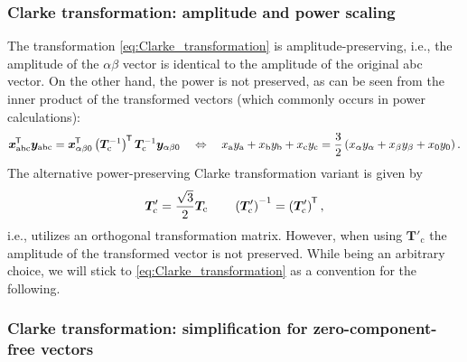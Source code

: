 \begin{frame}
	\frametitle{Clarke transformation: amplitude and power scaling}
    The transformation \eqref{eq:Clarke_transformation} is amplitude-preserving, i.e., the amplitude of the $\alpha\beta$ vector is identical to the amplitude of the original abc vector. On the other hand, the power is not preserved, as can be seen from the inner product of the transformed vectors (which commonly occurs in power calculations):
    \begin{equation*}
        \bm{x}_{\mathrm{abc}}^{\mkern-1.5mu\mathsf{T}} \bm{y}_{\mathrm{abc}} = \bm{x}_\mathrm{\alpha \beta 0}^{\mkern-1.5mu\mathsf{T}}\left(\bm{T}_\mathrm{c}^{-1}\right)^{\mkern-1.5mu\mathsf{T}} \bm{T}_\mathrm{c}^{-1}\bm{y}_\mathrm{\alpha \beta 0} \quad \Leftrightarrow \quad x_\mathrm{a}y_\mathrm{a} + x_\mathrm{b}y_\mathrm{b} + x_\mathrm{c}y_\mathrm{c} = \frac{3}{2}\left(x_\alpha y_\alpha + x_\beta y_\beta + x_0 y_0 \right).
    \end{equation*}
    The alternative power-preserving Clarke transformation variant is given by
    \begin{equation}
        \renewcommand{\arraystretch}{1.2}
        \bm{T}'_\mathrm{c} = \frac{\sqrt{3}}{2} \bm{T}_\mathrm{c} \qquad \left(\bm{T}'_\mathrm{c}\right)^{-1} = \left(\bm{T}'_\mathrm{c}\right)\T,
        \label{eq:Clarke_transformation_power_preserving}
    \end{equation}
    i.e., utilizes an orthogonal transformation matrix. However, when using $\bm{T}'_\mathrm{c}$ the amplitude of the transformed vector is not preserved. While being an arbitrary choice, we will stick to \eqref{eq:Clarke_transformation} as a convention for the following. 
\end{frame}

\begin{frame}
	\frametitle{Clarke transformation: simplification for zero-component-free vectors}
     
\end{frame}